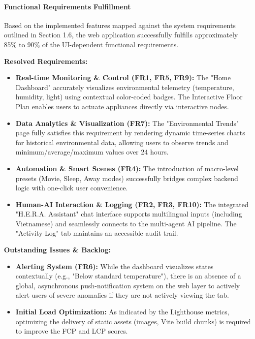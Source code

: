 \paragraph{Functional Requirements Fulfillment}
Based on the implemented features mapped against the system requirements outlined in Section 1.6, the web application successfully fulfills approximately 85\% to 90\% of the UI-dependent functional requirements. 

\textbf{Resolved Requirements:}
\begin{itemize}
    \item \textbf{Real-time Monitoring \& Control (FR1, FR5, FR9):} The "Home Dashboard" accurately visualizes environmental telemetry (temperature, humidity, light) using contextual color-coded badges. The Interactive Floor Plan enables users to actuate appliances directly via interactive nodes.
    \item \textbf{Data Analytics \& Visualization (FR7):} The "Environmental Trends" page fully satisfies this requirement by rendering dynamic time-series charts for historical environmental data, allowing users to observe trends and minimum/average/maximum values over 24 hours.
    \item \textbf{Automation \& Smart Scenes (FR4):} The introduction of macro-level presets (Movie, Sleep, Away modes) successfully bridges complex backend logic with one-click user convenience.
    \item \textbf{Human-AI Interaction \& Logging (FR2, FR3, FR10):} The integrated "H.E.R.A. Assistant" chat interface supports multilingual inputs (including Vietnamese) and seamlessly connects to the multi-agent AI pipeline. The "Activity Log" tab maintains an accessible audit trail.
\end{itemize}

\textbf{Outstanding Issues \& Backlog:}
\begin{itemize}
    \item \textbf{Alerting System (FR6):} While the dashboard visualizes states contextually (e.g., "Below standard temperature"), there is an absence of a global, asynchronous push-notification system on the web layer to actively alert users of severe anomalies if they are not actively viewing the tab.
    \item \textbf{Initial Load Optimization:} As indicated by the Lighthouse metrics, optimizing the delivery of static assets (images, Vite build chunks) is required to improve the FCP and LCP scores.
\end{itemize}



